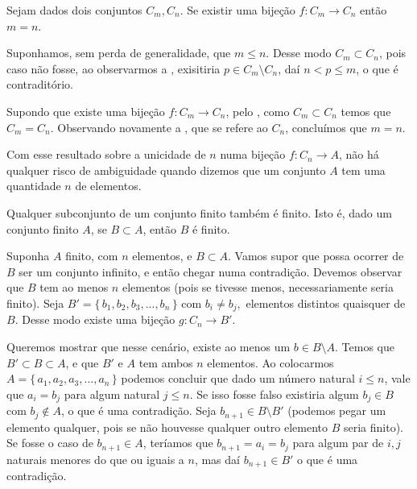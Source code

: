 \documentclass[../main.tex]{subfiles}
\begin{document}
\begin{teo}
    Sejam dados dois conjuntos $C_m, C_n$. Se existir uma bijeção $f \colon C_m \to C_n$ então $m=n$.
\end{teo}
\begin{dem}
    Suponhamos, sem perda de generalidade, que $m \leq n$. Desse modo $C_m \subset C_n$, pois caso não fosse, ao observarmos a , exisitiria $p \in C_m \setminus C_n$, daí $n < p \leq m$, o que é contraditório.

    Supondo que existe uma bijeção $f \colon C_m \to C_n$, pelo , como $C_m \subset C_n$ temos que $C_m = C_n$. Observando novamente a , que se refere ao $C_n$, concluímos que $m=n$.
\end{dem}

Com esse resultado sobre a unicidade de $n$ numa bijeção $f: C_n \to A$, não há qualquer risco de ambiguidade quando dizemos que um conjunto $A$ tem uma quantidade $n$ de elementos.

\begin{teo}\label{enum-teo-subconjuntoDeConjuntoFinitoFinito}
    Qualquer subconjunto de um conjunto finito também é finito. Isto é, dado um conjunto finito $A$, se $B \subset A$, então $B$ é finito. 
\end{teo}
\begin{dem}
    Suponha $A$ finito, com $n$ elementos, e $B \subset A$.
    Vamos supor que possa ocorrer de $B$ ser um conjunto infinito, e então chegar numa contradição.
    Devemos observar que $B$ tem ao menos $n$ elementos (pois se tivesse menos, necessariamente seria finito). 
    Seja $B' = \{\,b_1, b_2, b_3, ..., b_n\,\}$ com $b_i \neq b_j,$ elementos distintos quaisquer de $B$. Desse modo existe uma bijeção $g \colon C_n \to B'$. 
    
    Queremos mostrar que nesse cenário, existe ao menos um $b \in B \setminus A$. 
    Temos que $B' \subset B \subset A$, e que $B'$ e $A$ tem ambos $n$ elementos. Ao colocarmos $A = \{\,a_1,a_2,a_3,...,a_n\,\}$ podemos concluir que dado um número natural $i \leq n$, vale que $a_i = b_j$ para algum natural $j \leq n$. Se isso fosse falso existiria algum $b_j \in B$ com $b_j \not\in A$, o que é uma contradição. Seja $b_{n+1} \in B \setminus B'$ (podemos pegar um elemento qualquer, pois se não houvesse qualquer outro elemento $B$ seria finito). Se fosse o caso de $b_{n+1} \in A$, teríamos que $b_{n+1} = a_i = b_j$ para algum par de $i,j$ naturais menores do que ou iguais a $n$, mas daí $b_{n+1} \in B'$ o que é uma contradição.    
\end{dem}
\end{document}
